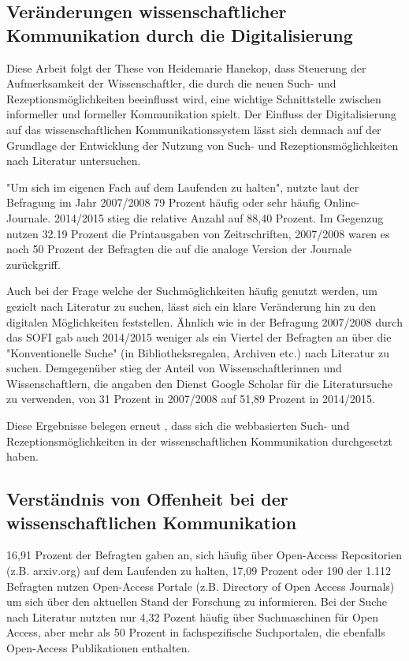 \subsection{Veränderungen wissenschaftlicher Kommunikation durch die Digitalisierung}

Diese Arbeit folgt der These von Heidemarie Hanekop, dass Steuerung der Aufmerksamkeit der Wissenschaftler, die durch die neuen Such- und Rezeptionsmöglichkeiten beeinflusst wird, eine wichtige Schnittstelle zwischen informeller und formeller Kommunikation spielt\cite{Hanekop_2014}. Der Einfluss der Digitalisierung auf das wissenschaftlichen Kommunikationssystem lässt sich demnach auf der Grundlage der Entwicklung der Nutzung von Such- und Rezeptionsmöglichkeiten nach Literatur untersuchen. 

"Um sich im eigenen Fach auf dem Laufenden zu halten", nutzte laut der Befragung im Jahr 2007/2008 79 Prozent häufig oder sehr häufig Online-Journale. 2014/2015 stieg die relative Anzahl auf 88,40 Prozent. Im Gegenzug nutzen 32.19 Prozent die Printausgaben von Zeitrschriften, 2007/2008 waren es noch 50 Prozent der Befragten die auf die analoge Version der Journale zurückgriff.

Auch bei der Frage welche der Suchmöglichkeiten häufig genutzt werden, um gezielt nach Literatur zu suchen, lässt sich ein klare Veränderung hin zu den digitalen Möglichkeiten feststellen. Ähnlich wie in der Befragung 2007/2008 durch das SOFI gab auch 2014/2015 weniger als ein Viertel der Befragten an über die "Konventionelle Suche" (in Bibliotheksregalen, Archiven etc.) nach Literatur zu suchen. Demgegenüber stieg der Anteil von Wissenschaftlerinnen und Wissenschaftlern, die angaben den Dienst Google Scholar für die Literatursuche zu verwenden, von 31 Prozent in 2007/2008 auf 51,89 Prozent in 2014/2015.

Diese Ergebnisse belegen erneut \cite{Hanekop_2014}, dass sich die webbasierten Such- und Rezeptionsmöglichkeiten in der wissenschaftlichen Kommunikation durchgesetzt haben.

\subsection{Verständnis von Offenheit bei der wissenschaftlichen Kommunikation}

16,91 Prozent der Befragten gaben an, sich häufig über Open-Access Repositorien (z.B. arxiv.org) auf dem Laufenden zu halten, 17,09 Prozent oder 190 der 1.112 Befragten nutzen Open-Access Portale (z.B. Directory of Open Access Journals) um sich über den aktuellen Stand der Forschung zu informieren. Bei der Suche nach Literatur nutzten nur 4,32 Pozent häufig über Suchmaschinen für Open Access, aber mehr als 50 Prozent in fachspezifische Suchportalen, die ebenfalls Open-Access Publikationen enthalten. 

